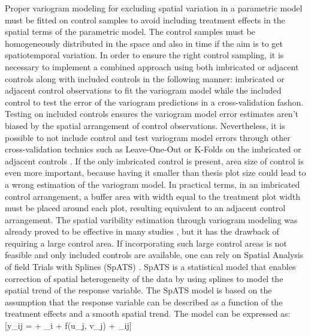 \documentclass[12pt,a4paper,oneside]{report}
\begin{document}
Proper variogram modeling for excluding spatial variation in a parametric model
must be fitted on control samples \cite{lark_optimized_2002, minasny_efficient_2005}
to avoid including treatment effects in the 
spatial terms of the parametric model. 
The control samples must be homogeneously distributed
in the space and also in time if the aim is to get spatiotemporal variation.
In order to ensure the right control sampling, it is necessary to implement a 
combined approach using both imbricated or adjacent controls along with included 
controls in the following manner:
imbricated or adjacent control observations to fit the variogram model 
while the included control to test the error of the variogram predictions in a
cross-validation fashon. Testing on included controls ensures the variogram model 
error estimates aren't biased by the spatial arrangement of control observations. 
Nevertheless, it is possible to not include control and test variogram model errors
through other cross-validation technics such as Leave-One-Out or K-Folds on the 
imbricated or adjacent controls
\cite{webster_geostatistics_2007, hengl_practical_2009}. 
If the only imbricated control is present, area size of control is even 
more important, because having it smaller than thesis plot size could lead to a 
wrong estimation of the variogram model. In practical terms, in an imbricated control
arrangement, a buffer area with width equal to the treatment plot width must be placed around each plot,
resulting equivalent to an adjacent control arrangement. 
The spatial varibility estimation through variogram modeling was already proved 
to be effective in many studies \cite{bullockDataIntensiveFarmManagement2019,castrignanoGeostatisticalApproachModelling2017,jinEfficientGeostatisticalAnalysis2021,puntelLeveragingDigitalAgriculture2024,trevisanSpatialVariabilityCrop2021}, 
but it has the drawback of requiring a large control area. 
If incorporating such large control areas is not feasible and only included 
controls are available, 
one can rely on Spatial Analysis of field Trials with Splines (SpATS)
\cite{rodriguez-alvarezCorrectingSpatialHeterogeneity2018,rodriguez-alvarezFastSmoothingParameter2015,leeEfficientTwodimensionalSmoothing2013}.
SpATS is a statistical model that enables correction of spatial heterogeneity
of the data by using splines to model the spatial trend of the response variable.
The SpATS model is based on the assumption that the response variable can be
described as a function of the treatment effects and a smooth spatial trend.
The model can be expressed as:
[y_{ij} = \mu + \tau_i + f(u_j, v_j) + \varepsilon_{ij}]
\end{document}
